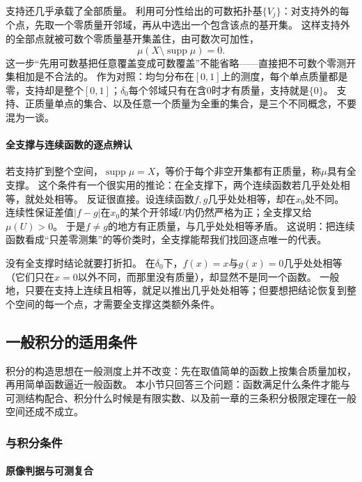 支持还几乎承载了全部质量。
利用可分性给出的可数拓扑基$\{V_j\}$：对支持外的每个点，先取一个零质量开邻域，再从中选出一个包含该点的基开集。
这样支持外的全部点就被可数个零质量基开集盖住，由可数次可加性，
\[
 \mu(X\setminus\operatorname{supp}\mu)=0.
\]
这一步“先用可数基把任意覆盖变成可数覆盖”不能省略——直接把不可数个零测开集相加是不合法的。
作为对照：均匀分布在$[0,1]$上的测度，每个单点质量都是零，支持却是整个$[0,1]$；$\delta_0$每个邻域只有在含$0$时才有质量，支持就是$\{0\}$。
支持、正质量单点的集合、以及任意一个质量为全重的集合，是三个不同概念，不要混为一谈。

\paragraph{全支撑与连续函数的逐点辨认}

若支持扩到整个空间，$\operatorname{supp}\mu=X$，等价于每个非空开集都有正质量，称$\mu$具有全支撑。
这个条件有一个很实用的推论：在全支撑下，两个连续函数若几乎处处相等，就处处相等。
反证很直接。设连续函数$f,g$几乎处处相等，却在$x_0$处不同。
连续性保证差值$|f-g|$在$x_0$的某个开邻域$U$内仍然严格为正；全支撑又给$\mu(U)>0$。
于是$f\neq g$的地方有正质量，与几乎处处相等矛盾。
这说明：把连续函数看成“只差零测集”的等价类时，全支撑能帮我们找回逐点唯一的代表。

没有全支撑时结论就要打折扣。
在$\delta_0$下，$f(x)=x$与$g(x)=0$几乎处处相等（它们只在$x=0$以外不同，而那里没有质量），却显然不是同一个函数。
一般地，只要在支持上连续且相等，就足以推出几乎处处相等；但要想把结论恢复到整个空间的每一个点，才需要全支撑这类额外条件。

\subsection{一般积分的适用条件}

积分的构造思想在一般测度上并不改变：先在取值简单的函数上按集合质量加权，再用简单函数逼近一般函数。
本小节只回答三个问题：函数满足什么条件才能与可测结构配合、积分什么时候是有限实数、以及前一章的三条积分极限定理在一般空间还成不成立。

\subsubsection{与积分条件}

\paragraph{原像判据与可测复合}

